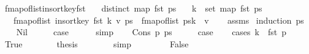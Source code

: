 \begin{isabellebody}
\ fmap{\isacharunderscore}{\kern0pt}of{\isacharunderscore}{\kern0pt}list{\isacharunderscore}{\kern0pt}insort{\isacharunderscore}{\kern0pt}key{\isacharunderscore}{\kern0pt}fst{\isacharcolon}{\kern0pt}\isanewline
\ \ \ {\isachardoublequoteopen}distinct\ {\isacharparenleft}{\kern0pt}map\ fst\ ps{\isacharparenright}{\kern0pt}{\isachardoublequoteclose}\isanewline
\ \ \ {\isachardoublequoteopen}k\ {\isasymnotin}\ set\ {\isacharparenleft}{\kern0pt}map\ fst\ ps{\isacharparenright}{\kern0pt}{\isachardoublequoteclose}\isanewline
\ \ \ {\isachardoublequoteopen}fmap{\isacharunderscore}{\kern0pt}of{\isacharunderscore}{\kern0pt}list\ {\isacharparenleft}{\kern0pt}insort{\isacharunderscore}{\kern0pt}key\ fst\ {\isacharparenleft}{\kern0pt}k{\isacharcomma}{\kern0pt}\ v{\isacharparenright}{\kern0pt}\ ps{\isacharparenright}{\kern0pt}\ {\isacharequal}{\kern0pt}\ {\isacharparenleft}{\kern0pt}fmap{\isacharunderscore}{\kern0pt}of{\isacharunderscore}{\kern0pt}list\ ps{\isacharparenright}{\kern0pt}{\isacharparenleft}{\kern0pt}k\ {\isachardollar}{\kern0pt}{\isachardollar}{\kern0pt}{\isacharcolon}{\kern0pt}{\isacharequal}{\kern0pt}\ v{\isacharparenright}{\kern0pt}{\isachardoublequoteclose}\isanewline
%
\isadelimproof
\ \ %
\endisadelimproof
%
\isatagproof
{}\isamarkupfalse%
\ assms\isanewline
{}\isamarkupfalse%
\ {\isacharparenleft}{\kern0pt}induction\ ps{\isacharparenright}{\kern0pt}\isanewline
\ \ \isamarkupfalse%
\ Nil\isanewline
\ \ \isamarkupfalse%
\ \isamarkupfalse%
\ {\isacharquery}{\kern0pt}case\isanewline
\ \ \ \ \isamarkupfalse%
\ simp\isanewline
{}\isamarkupfalse%
\isanewline
\ \ \isamarkupfalse%
\ {\isacharparenleft}{\kern0pt}Cons\ p\ ps{\isacharparenright}{\kern0pt}\isanewline
\ \ \isamarkupfalse%
\ \isamarkupfalse%
\ {\isacharquery}{\kern0pt}case\isanewline
\ \ \isamarkupfalse%
\ {\isacharparenleft}{\kern0pt}cases\ {\isachardoublequoteopen}k\ {\isasymle}\ fst\ p{\isachardoublequoteclose}{\isacharparenright}{\kern0pt}\isanewline
\ \ \ \ \isamarkupfalse%
\ True\isanewline
\ \ \ \ \isamarkupfalse%
\ \isamarkupfalse%
\ {\isacharquery}{\kern0pt}thesis\isanewline
\ \ \ \ \ \ \isamarkupfalse%
\ simp\isanewline
\ \ \isamarkupfalse%
\isanewline
\ \ \ \ \isamarkupfalse%
\ False\isanewline
\ \ \ \ \isamarkupfalse%
\ \isamarkupfalse%

\end{isabellebody}
